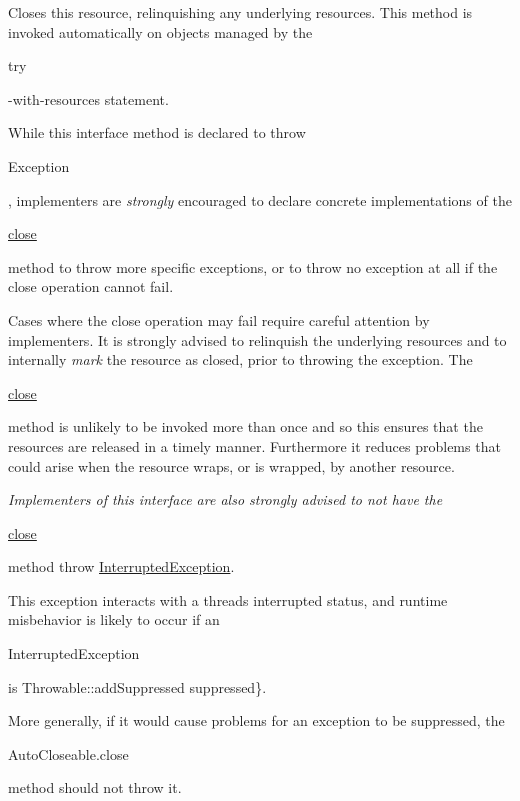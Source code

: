 Closes this resource, relinquishing any underlying resources. This method is invoked automatically on objects managed by the 
\begin{DoxyCode}
\textcolor{keywordflow}{try} 
\end{DoxyCode}
 -\/with-\/resources statement. 

While this interface method is declared to throw
\begin{DoxyCode}
Exception 
\end{DoxyCode}
 , implementers are {\itshape strongly} encouraged to declare concrete implementations of the
\begin{DoxyCode}
\hyperlink{classedu_1_1sjsu_1_1amigo_1_1mp_1_1kafka_1_1_message_producer_a0927f16496c80552219dc7abc01ae07c}{close} 
\end{DoxyCode}
 method to throw more specific exceptions, or to throw no exception at all if the close operation cannot fail. 

Cases where the close operation may fail require careful attention by implementers. It is strongly advised to relinquish the underlying resources and to internally {\itshape mark} the resource as closed, prior to throwing the exception. The
\begin{DoxyCode}
\hyperlink{classedu_1_1sjsu_1_1amigo_1_1mp_1_1kafka_1_1_message_producer_a0927f16496c80552219dc7abc01ae07c}{close} 
\end{DoxyCode}
 method is unlikely to be invoked more than once and so this ensures that the resources are released in a timely manner. Furthermore it reduces problems that could arise when the resource wraps, or is wrapped, by another resource. 

{\itshape Implementers of this interface are also strongly advised to not have the
\begin{DoxyCode}
\hyperlink{classedu_1_1sjsu_1_1amigo_1_1mp_1_1kafka_1_1_message_producer_a0927f16496c80552219dc7abc01ae07c}{close} 
\end{DoxyCode}
 method throw \hyperlink{}{Interrupted\+Exception}.} 

This exception interacts with a thread\textquotesingle{}s interrupted status, and runtime misbehavior is likely to occur if an
\begin{DoxyCode}
InterruptedException 
\end{DoxyCode}
 is  Throwable\+::add\+Suppressed suppressed\}. 

More generally, if it would cause problems for an exception to be suppressed, the
\begin{DoxyCode}
AutoCloseable.close 
\end{DoxyCode}
 method should not throw it. 

